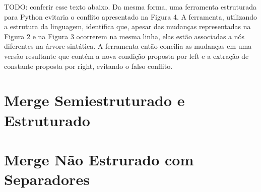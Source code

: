 TODO: conferir esse texto abaixo.
Da mesma forma, uma ferramenta estruturada para Python evitaria o
conflito apresentado na Figura 4. A ferramenta, utilizando a estrutura da
linguagem, identifica que, apesar das mudanças representadas na Figura 2 e na
Figura 3 ocorrerem na mesma linha, elas estão associadas a nós diferentes na árvore
sintática. A ferramenta então concilia as mudanças em uma versão resultante que contém a
nova condição proposta por left e a extração de constante proposta por right,
evitando o falso conflito.
\section{Merge Semiestruturado e Estruturado}

\section{Merge Não Estrurado com Separadores}
